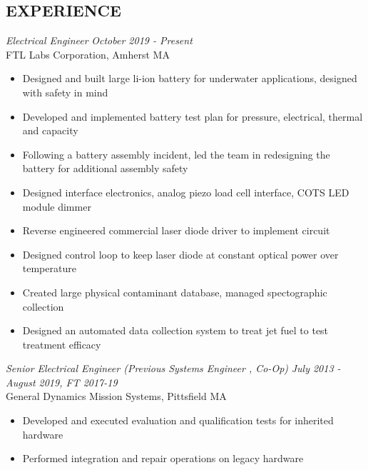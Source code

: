 \documentclass[line,mmmargin]{res}
\begin{document}
\begin{resume}
\section{EXPERIENCE} 
{\sl Electrical Engineer} \hfill {\sl October 2019 - Present}\\
	FTL Labs Corporation, Amherst MA
	\begin{itemize}  \itemsep -2pt %
		\item Designed and built large li-ion battery for
			underwater applications, designed with safety in mind
		\item Developed and implemented battery test plan
			for pressure, electrical, thermal and capacity
		\item Following a battery assembly incident, led the 
			team in redesigning the battery for additional assembly safety
		\item Designed interface electronics, analog piezo
			load cell interface, COTS LED module dimmer
		\item Reverse engineered commercial laser diode driver to
			implement circuit
		\item Designed control loop to keep laser diode at constant
			optical power over temperature
		\item Created large physical contaminant database, managed
			spectographic collection
		\item Designed an automated data collection system to treat jet
			fuel to test treatment efficacy
	\end{itemize}
	\vspace{-10pt}
{\sl Senior Electrical Engineer (Previous Systems Engineer , Co-Op)} \hfill
{\sl July 2013 - August 2019, FT 2017-19}\\
	General Dynamics Mission Systems, Pittsfield MA
	\begin{itemize}  \itemsep -2pt %
		\item Developed and executed evaluation and qualification tests for inherited hardware
		\item Performed integration and repair operations on legacy hardware

\end{itemize}
\end{resume}
\end{document}
